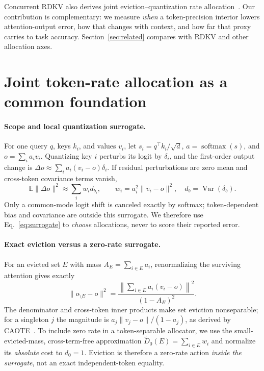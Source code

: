 \documentclass{article}
\theoremstyle{definition}
\begin{document}
Concurrent RDKV also derives joint eviction--quantization rate allocation~\citep{zhang2026rdkv}.  Our contribution is complementary: we measure \emph{when} a token-precision interior lowers attention-output error, how that changes with context, and how far that proxy carries to task accuracy.  Section~\ref{sec:related} compares with RDKV and other allocation axes.

\section{Joint token-rate allocation as a common foundation}
\label{sec:framework}

\paragraph{Scope and local quantization surrogate.}
For one query $q$, keys $k_i$, and values $v_i$, let
$s_i=q^\top k_i/\sqrt d$, $a=\operatorname{softmax}(s)$, and
$o=\sum_i a_i v_i$.  Quantizing key $i$ perturbs its logit by $\delta_i$, and the first-order output change is $\Delta o \approx \sum_i a_i(v_i-o)\delta_i$.
If residual perturbations are zero mean and cross-token covariance terms vanish,
\begin{equation}
  \mathbb E\|\Delta o\|^2
  \approx \sum_i w_i d_{b_i}, \qquad
  w_i=a_i^2\|v_i-o\|^2,\quad d_b=\operatorname{Var}(\delta_b).
  \label{eq:surrogate}
\end{equation}
Only a common-mode logit shift is canceled exactly by softmax; token-dependent bias and covariance are outside this surrogate.  We therefore use Eq.~\ref{eq:surrogate} to \emph{choose} allocations, never to score their reported error.

\paragraph{Exact eviction versus a zero-rate surrogate.}
For an evicted set $E$ with mass $A_E=\sum_{i\in E}a_i$, renormalizing the surviving attention gives exactly
\begin{equation}
 \|o_{\setminus E}-o\|^2
 =\frac{\left\|\sum_{i\in E}a_i(v_i-o)\right\|^2}{(1-A_E)^2}.
 \label{eq:exact-eviction}
\end{equation}
The denominator and cross-token inner products make set eviction nonseparable; for a singleton $j$ the magnitude is $a_j\|v_j-o\|/(1-a_j)$, as derived by CAOTE~\citep{goel2025caote}.
To include zero rate in a token-separable allocator, we use the small-evicted-mass, cross-term-free approximation
$\widetilde D_0(E)=\sum_{i\in E}w_i$ and normalize its \emph{absolute} cost to $d_0=1$.  Eviction is therefore a zero-rate action \emph{inside the surrogate}, not an exact independent-token equality.
\end{document}
